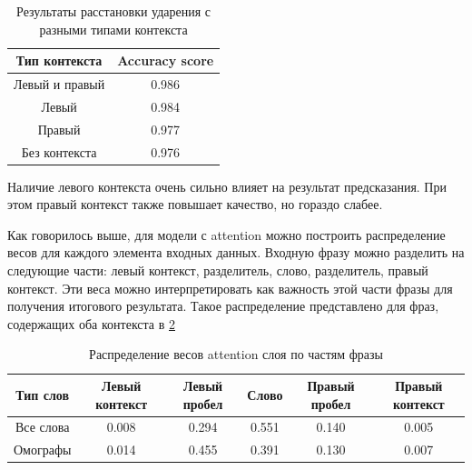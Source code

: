 \documentclass[14pt, a4paper, russian]{extreport}
\begin{document}
\begin{table}[H]
	\caption{Результаты расстановки ударения с разными типами контекста}
	
	\begin{small}
		\begin{center}
			\begin{tabular}{|c | c |}
				\hline
				Тип контекста  & Accuracy score \\ \hline
				Левый и правый & 0.986          \\ \hline
				    Левый      & 0.984          \\ \hline
				    Правый     & 0.977          \\ \hline
				Без контекста  & 0.976          \\ \hline
			\end{tabular}
		\end{center}
	\end{small}
	\label{table:cont}
\end{table}

Наличие левого контекста очень сильно влияет на результат предсказания. При этом правый контекст также повышает качество, но гораздо слабее.

Как говорилось выше, для модели с attention можно построить распределение весов для каждого элемента входных данных. Входную фразу можно разделить на следующие части: левый контекст, разделитель, слово, разделитель, правый контекст. Эти веса можно интерпретировать как важность этой части фразы для получения итогового результата. Такое распределение представлено для фраз, содержащих оба контекста в \cref{table:att_wei}

\begin{table}[H]
	\caption{Распределение весов attention слоя по частям фразы}
	
	\begin{small}
		\begin{center}
			\begin{tabular}{|c | c | c | c| c | c|}
				\hline
				Тип слов  & Левый контекст & Левый пробел & Слово & Правый пробел & Правый контекст \\ \hline
				Все слова & 0.008          & 0.294        & 0.551 & 0.140         & 0.005           \\ \hline
				Омографы  & 0.014          & 0.455        & 0.391 & 0.130         & 0.007           \\ \hline
			\end{tabular}
		\end{center}
	\end{small}
	\label{table:att_wei}
\end{table}
\end{document}
